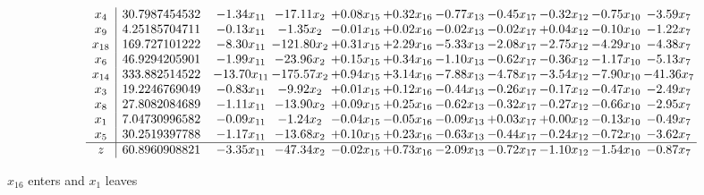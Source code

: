 \documentclass[9pt]{article}
\begin{document}
 \[\begin{array}{c| c c@{\hskip 2pt} c@{\hskip 2pt} c@{\hskip 2pt} c@{\hskip 2pt} c@{\hskip 2pt} c@{\hskip 2pt} c@{\hskip 2pt} c@{\hskip 2pt} c@{\hskip 2pt} }
 x_{4}   &  30.7987454532 & -1.34 x_{11} & -17.11 x_{2} & +  0.08 x_{15} & +  0.32 x_{16} & -0.77 x_{13} & -0.45 x_{17} & -0.32 x_{12} & -0.75 x_{10} & -3.59 x_{7}\\
 x_{9}   &  4.25185704711 & -0.13 x_{11} & -1.35 x_{2} & -0.01 x_{15} & +  0.02 x_{16} & -0.02 x_{13} & -0.02 x_{17} & +  0.04 x_{12} & -0.10 x_{10} & -1.22 x_{7}\\
 x_{18}   &  169.727101222 & -8.30 x_{11} & -121.80 x_{2} & +  0.31 x_{15} & +  2.29 x_{16} & -5.33 x_{13} & -2.08 x_{17} & -2.75 x_{12} & -4.29 x_{10} & -4.38 x_{7}\\
 x_{6}   &  46.9294205901 & -1.99 x_{11} & -23.96 x_{2} & +  0.15 x_{15} & +  0.34 x_{16} & -1.10 x_{13} & -0.62 x_{17} & -0.36 x_{12} & -1.17 x_{10} & -5.13 x_{7}\\
 x_{14}   &  333.882514522 & -13.70 x_{11} & -175.57 x_{2} & +  0.94 x_{15} & +  3.14 x_{16} & -7.88 x_{13} & -4.78 x_{17} & -3.54 x_{12} & -7.90 x_{10} & -41.36 x_{7}\\
 x_{3}   &  19.2246769049 & -0.83 x_{11} & -9.92 x_{2} & +  0.01 x_{15} & +  0.12 x_{16} & -0.44 x_{13} & -0.26 x_{17} & -0.17 x_{12} & -0.47 x_{10} & -2.49 x_{7}\\
 x_{8}   &  27.8082084689 & -1.11 x_{11} & -13.90 x_{2} & +  0.09 x_{15} & +  0.25 x_{16} & -0.62 x_{13} & -0.32 x_{17} & -0.27 x_{12} & -0.66 x_{10} & -2.95 x_{7}\\
 x_{1}   &  7.04730996582 & -0.09 x_{11} & -1.24 x_{2} & -0.04 x_{15} & -0.05 x_{16} & -0.09 x_{13} & +  0.03 x_{17} & +  0.00 x_{12} & -0.13 x_{10} & -0.49 x_{7}\\
 x_{5}   &  30.2519397788 & -1.17 x_{11} & -13.68 x_{2} & +  0.10 x_{15} & +  0.23 x_{16} & -0.63 x_{13} & -0.44 x_{17} & -0.24 x_{12} & -0.72 x_{10} & -3.62 x_{7}\\
\hline
z    &  60.8960908821 & -3.35 x_{11} & -47.34 x_{2} & -0.02 x_{15} & +  0.73 x_{16} & -2.09 x_{13} & -0.72 x_{17} & -1.10 x_{12} & -1.54 x_{10} & -0.87 x_{7}\\
\end{array}\]


 $ x_{16} $ enters and $ x_{1} $ leaves 
\end{document}
